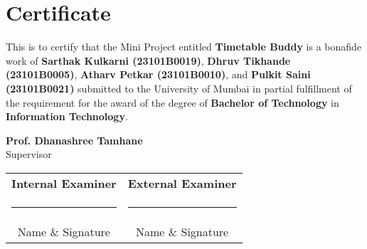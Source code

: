 \chapter*{Certificate}
\thispagestyle{empty}

\vspace{1cm}

This is to certify that the Mini Project entitled \textbf{Timetable Buddy} is a bonafide work of \textbf{Sarthak Kulkarni (23101B0019)}, \textbf{Dhruv Tikhande (23101B0005)}, \textbf{Atharv Petkar (23101B0010)}, and \textbf{Pulkit Saini (23101B0021)} submitted to the University of Mumbai in partial fulfillment of the requirement for the award of the degree of \textbf{Bachelor of Technology} in \textbf{Information Technology}.

\vspace{3cm}

\begin{center}
\textbf{Prof. Dhanashree Tamhane} \\
Supervisor
\end{center}

\vspace{4cm}

\begin{center}
\begin{tabular}{c c}
    \textbf{Internal Examiner} & \textbf{External Examiner} \\[1.5cm]
    \rule{5cm}{0.5pt} & \rule{5cm}{0.5pt} \\[0.3cm]
    Name \& Signature & Name \& Signature \\
\end{tabular}
\end{center}

